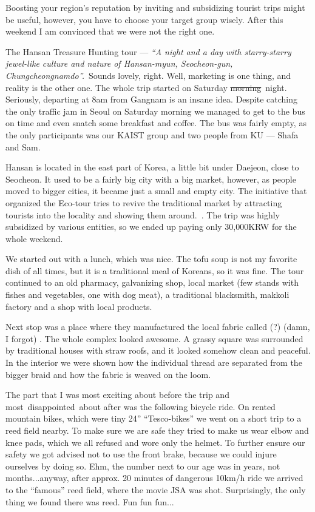 \begin{post}
	\begin{content}
Boosting your region's reputation by inviting and subsidizing tourist trips might be useful, however, you have to choose your target group wisely. After this weekend I am convinced that we were not the right one.

The Hansan Treasure Hunting tour --- \textit{``A night and a day with starry-starry jewel-like culture and nature of Hansan-myun, Seocheon-gun, Chungcheongnamdo''.} Sounds lovely, right. Well, marketing is one thing, and reality is the other one. The whole trip started on Saturday \sout{morning} night. Seriously, departing at 8am from Gangnam is an insane idea. Despite catching the only traffic jam in Seoul on Saturday morning we managed to get to the bus on time and even snatch some breakfast and coffee. The bus was fairly empty, as the only participants was our KAIST group and two people from KU --- Shafa and Sam.

Hansan is located in the east part of Korea, a little bit under Daejeon, close to Seocheon. It used to be a fairly big city with a big market, however, as people moved to bigger cities, it became just a small and empty city. The initiative that organized the Eco-tour tries to revive the traditional market by attracting tourists into the locality and showing them around. . The trip was highly subsidized by various entities, so we ended up paying only 30,000KRW for the whole weekend.

We started out with a lunch, which was nice. The tofu soup is not my favorite dish of all times, but it is a traditional meal of Koreans, so it was fine. The tour continued to an old pharmacy, galvanizing shop, local market (few stands with fishes and vegetables, one with dog meat), a traditional blacksmith, makkoli factory and a shop with local products.

Next stop was a place where they manufactured the local fabric called (?) (damn, I forgot) . The whole complex looked awesome. A grassy square was surrounded by traditional houses with straw roofs, and it looked somehow clean and peaceful. In the interior we were shown how the individual thread are separated from the bigger braid and how the fabric is weaved on the loom.

The part that I was most exciting about before the trip and most disappointed about after was the following bicycle ride. On rented mountain bikes, which were tiny 24'' ``Tesco-bikes'' we went on a short trip to a reed field nearby. To make sure we are safe they tried to make us wear elbow and knee pads, which we all refused and wore only the helmet. To further ensure our safety we got advised not to use the front brake, because we could injure ourselves by doing so. Ehm, the number next to our age was in years, not months...anyway, after approx. 20 minutes of dangerous 10km/h ride we arrived to the ``famous'' reed field, where the movie JSA was shot. Surprisingly, the only thing we found there was reed. Fun fun fun...


\end{content}
\end{post}
